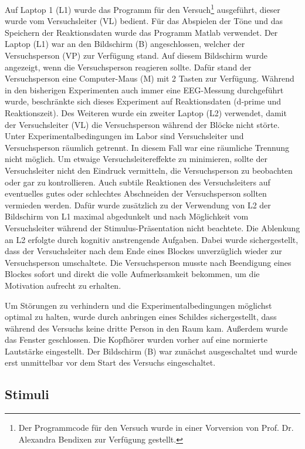 \documentclass[doc,a4paper,12pt]{apa6}
\begin{document}
Auf Laptop 1 (L1) wurde das Programm für den Versuch\footnote{\label{foot:1}Der Programmcode für den Versuch wurde in einer Vorversion von Prof. Dr. Alexandra Bendixen zur Verfügung gestellt.} ausgeführt, dieser wurde vom Versuchsleiter (VL) bedient. Für das Abspielen der Töne und das Speichern der Reaktionsdaten wurde das Programm Matlab verwendet. Der Laptop (L1) war an den Bildschirm (B) angeschlossen, welcher der Versuchsperson (VP) zur Verfügung stand. Auf diesem Bildschirm wurde angezeigt, wenn die Versuchsperson reagieren sollte. Dafür stand der Versuchsperson eine Computer-Maus (M) mit 2 Tasten zur Verfügung. Während in den bisherigen Experimenten auch immer eine EEG-Messung durchgeführt wurde, beschränkte sich dieses Experiment auf Reaktionsdaten (d-prime und Reaktionszeit). Des Weiteren wurde ein zweiter Laptop (L2) verwendet, damit der Versuchsleiter (VL) die Versuchsperson während der Blöcke nicht störte. Unter Experimentalbedingungen im Labor sind Versuchsleiter und Versuchsperson räumlich getrennt. In diesem Fall war eine räumliche Trennung nicht möglich. Um etwaige Versuchsleitereffekte zu minimieren, sollte der Versuchsleiter nicht den Eindruck vermitteln, die Versuchsperson zu beobachten oder gar zu kontrollieren. Auch subtile Reaktionen des Versuchsleiters auf eventuelles gutes oder schlechtes Abschneiden der Versuchsperson sollten vermieden werden. Dafür wurde zusätzlich zu der Verwendung von L2 der Bildschirm von L1 maximal abgedunkelt und nach Möglichkeit vom Versuchsleiter während der Stimulus-Präsentation nicht beachtete. Die Ablenkung an L2 erfolgte durch kognitiv anstrengende Aufgaben. Dabei wurde sichergestellt, dass der Versuchsleiter nach dem Ende eines Blockes unverzüglich wieder zur Versuchsperson umschaltete. Die Versuchsperson musste nach Beendigung eines Blockes sofort und direkt die volle Aufmerksamkeit bekommen, um die Motivation aufrecht zu erhalten.

Um Störungen zu verhindern und die Experimentalbedingungen möglichst optimal zu halten, wurde durch anbringen eines Schildes sichergestellt, dass während des Versuchs keine dritte Person in den Raum kam. Außerdem wurde das Fenster geschlossen. Die Kopfhörer wurden vorher auf eine normierte Lautstärke eingestellt. Der Bildschirm (B) war zunächst ausgeschaltet und wurde erst unmittelbar vor dem Start des Versuchs eingeschaltet.

\subsection{Stimuli}
\end{document}
